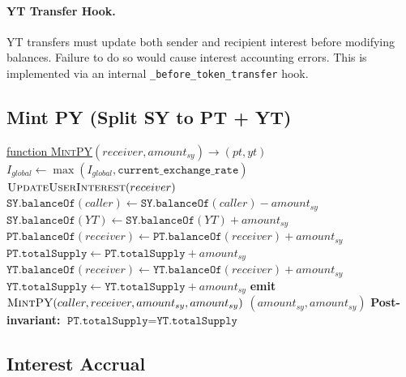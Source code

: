 \paragraph{YT Transfer Hook.} YT transfers must update both sender and recipient interest before modifying balances. Failure to do so would cause interest accounting errors. This is implemented via an internal \texttt{\_before\_token\_transfer} hook.

\subsection{Mint PY (Split SY to PT + YT)}

\begin{algorithm}[H]
\caption{Mint Principal and Yield Tokens}
\underline{function \textsc{MintPY}}$(receiver, amount_{sy}) \rightarrow (pt, yt)$\;
\BlankLine
{}
$I_{global} \gets \max(I_{global}, \texttt{current\_exchange\_rate})$\;
$\textsc{UpdateUserInterest}(receiver)$\;
\BlankLine
{}
$\texttt{SY.balanceOf}(caller) \gets \texttt{SY.balanceOf}(caller) - amount_{sy}$\;
$\texttt{SY.balanceOf}(YT) \gets \texttt{SY.balanceOf}(YT) + amount_{sy}$\;
\BlankLine
{}
$\texttt{PT.balanceOf}(receiver) \gets \texttt{PT.balanceOf}(receiver) + amount_{sy}$\;
$\texttt{PT.totalSupply} \gets \texttt{PT.totalSupply} + amount_{sy}$\;
$\texttt{YT.balanceOf}(receiver) \gets \texttt{YT.balanceOf}(receiver) + amount_{sy}$\;
$\texttt{YT.totalSupply} \gets \texttt{YT.totalSupply} + amount_{sy}$\;
\BlankLine
\textbf{emit} $\textsc{MintPY}(caller, receiver, amount_{sy}, amount_{sy})$\;
\Return $(amount_{sy}, amount_{sy})$\;
\BlankLine
\textbf{Post-invariant:} $\texttt{PT.totalSupply} = \texttt{YT.totalSupply}$\;
\BlankLine
{}
\end{algorithm}

\subsection{Interest Accrual}

